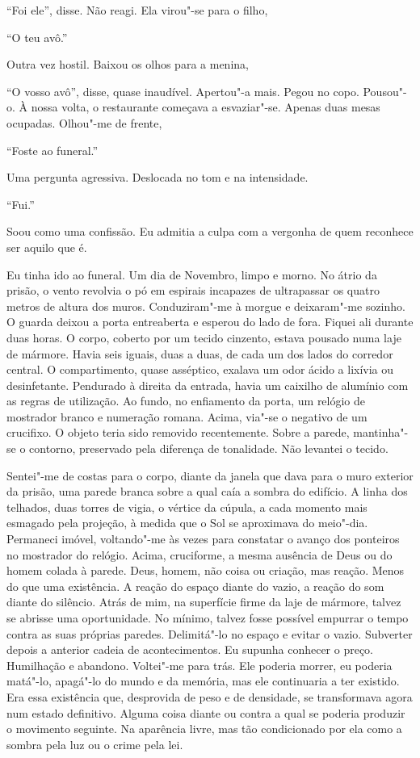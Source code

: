 ``Foi ele'',
disse. Não reagi. Ela virou"-se para o filho,

``O teu avô.''

Outra vez hostil. Baixou os olhos para a menina,

``O vosso avô'',
disse, quase inaudível. Apertou"-a mais. Pegou no copo. Pousou"-o. À
nossa volta, o restaurante começava a esvaziar"-se. Apenas duas mesas
ocupadas. Olhou"-me de frente,

``Foste ao funeral.''

Uma pergunta agressiva. Deslocada no tom e na intensidade.

``Fui.''

Soou como uma confissão. Eu admitia a culpa com a vergonha de quem
reconhece ser aquilo que é.

Eu tinha ido ao funeral. Um dia de Novembro, limpo e morno. No átrio da
prisão, o vento revolvia o pó em espirais incapazes de ultrapassar os
quatro metros de altura dos muros. Conduziram"-me à morgue e
deixaram"-me sozinho. O guarda deixou a porta entreaberta e esperou do
lado de fora. Fiquei ali durante duas horas. O corpo, coberto por um
tecido cinzento, estava pousado numa laje de mármore. Havia seis iguais,
duas a duas, de cada um dos lados do corredor central. O compartimento,
quase asséptico, exalava um odor ácido a lixívia ou desinfetante.
Pendurado à direita da entrada, havia um caixilho de alumínio com as
regras de utilização. Ao fundo, no enfiamento da porta, um relógio de
mostrador branco e numeração romana. Acima, via"-se o negativo de um
crucifixo. O objeto teria sido removido recentemente. Sobre a parede,
mantinha"-se o contorno, preservado pela diferença de tonalidade. Não
levantei o tecido.

Sentei"-me de costas para o corpo, diante da janela que dava para o muro
exterior da prisão, uma parede branca sobre a qual caía a sombra do
edifício. A linha dos telhados, duas torres de vigia, o vértice da
cúpula, a cada momento mais esmagado pela projeção, à medida que o Sol
se aproximava do meio"-dia. Permaneci imóvel, voltando"-me às vezes para
constatar o avanço dos ponteiros no mostrador do relógio. Acima,
cruciforme, a mesma ausência de Deus ou do homem colada à parede. Deus,
homem, não coisa ou criação, mas reação. Menos do que uma existência. A
reação do espaço diante do vazio, a reação do som diante do silêncio.
Atrás de mim, na superfície firme da laje de mármore, talvez se abrisse
uma oportunidade. No mínimo, talvez fosse possível empurrar o tempo
contra as suas próprias paredes. Delimitá"-lo no espaço e evitar o
vazio. Subverter depois a anterior cadeia de acontecimentos. Eu supunha
conhecer o preço. Humilhação e abandono. Voltei"-me para trás. Ele
poderia morrer, eu poderia matá"-lo, apagá"-lo do mundo e da memória,
mas ele continuaria a ter existido. Era essa existência que, desprovida
de peso e de densidade, se transformava agora num estado definitivo.
Alguma coisa diante ou contra a qual se poderia produzir o movimento
seguinte. Na aparência livre, mas tão condicionado por ela como a sombra
pela luz ou o crime pela lei.

